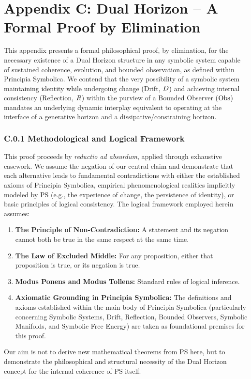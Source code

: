 \clearpage
\chapter*{Appendix C: Dual Horizon – A Formal Proof by Elimination}
This appendix presents a formal philosophical proof, by elimination, for the necessary existence of a Dual Horizon structure in any symbolic system capable of sustained coherence, evolution, and bounded observation, as defined within Principia Symbolica. We contend that the very possibility of a symbolic system maintaining identity while undergoing change (Drift, \(D\)) and achieving internal consistency (Reflection, \(R\)) within the purview of a Bounded Observer (\(\mathrm{Obs}\)) mandates an underlying dynamic interplay equivalent to operating at the interface of a generative horizon and a dissipative/constraining horizon.
\subsection*{C.0.1 Methodological and Logical Framework} \label{subsec:appC_methodological_logical_framework}
This proof proceeds by \emph{reductio ad absurdum}, applied through exhaustive casework. We assume the negation of our central claim and demonstrate that each alternative leads to fundamental contradictions with either the established axioms of Principia Symbolica, empirical phenomenological realities implicitly modeled by PS (e.g., the experience of change, the persistence of identity), or basic principles of logical consistency.
The logical framework employed herein assumes:
\begin{enumerate}
    \item \textbf{The Principle of Non-Contradiction:} A statement and its negation cannot both be true in the same respect at the same time.
    \item \textbf{The Law of Excluded Middle:} For any proposition, either that proposition is true, or its negation is true.
    \item \textbf{Modus Ponens and Modus Tollens:} Standard rules of logical inference.
    \item \textbf{Axiomatic Grounding in Principia Symbolica:} The definitions and axioms established within the main body of Principia Symbolica (particularly concerning Symbolic Systems, Drift, Reflection, Bounded Observers, Symbolic Manifolds, and Symbolic Free Energy) are taken as foundational premises for this proof.
\end{enumerate}
Our aim is not to derive new mathematical theorems from PS here, but to demonstrate the philosophical and structural necessity of the Dual Horizon concept for the internal coherence of PS itself.
